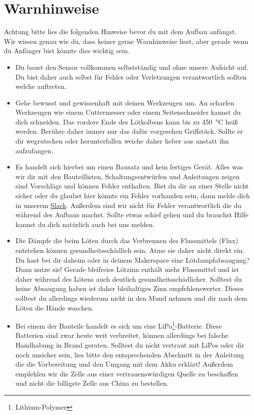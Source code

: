 \documentclass[12pt, a4paper]{article}		%
\begin{document}
\section{Warnhinweise}
Achtung bitte lies die folgenden Hinweise bevor du mit dem Aufbau anfängst. Wir wissen genau wie du, dass keiner gerne Warnhinweise liest, aber gerade wenn du Anfänger bist könnte dies wichtig sein. 

\begin{itemize}
	\item Du baust den Sensor vollkommen selbstständig und ohne unsere Aufsicht auf. Du bist daher auch selbst für Fehler oder Verletzungen verantwortlich sollten welche auftreten.
	\item Gehe bewusst und gewissenhaft mit deinen Werkzeugen um. An scharfen Werkzeugen wie einem Cuttermesser oder einem Seitenschneider kannst du dich schneiden. Das vordere Ende des Lötkolbens kann bis zu \SI{450}{\degreeCelsius} heiß werden. Berühre daher immer nur das dafür vorgesehen Griffstück. Sollte er dir wegrutschen oder herunterfallen weiche daher lieber aus anstatt ihn aufzufangen.
	\item Es handelt sich hierbei um einen Bausatz und kein fertiges Gerät. Alles was wir dir mit den Bauteillisten, Schaltungsentwürfen und Anleitungen zeigen sind Vorschläge und können Fehler enthalten. Bist du dir an einer Stelle nicht sicher oder du glaubst hier könnte ein Fehler vorhanden sein, dann melde dich in unserem \href{openbikesensor.org/slack}{Slack}. Außerdem sind wir nicht für Fehler verantwortlich die du während des Aufbaus machst. Sollte etwas schief gehen und du brauchst Hilfe kannst du dich natürlich auch bei uns melden.
	\item Die Dämpfe die beim Löten durch das Verbrennen des Flussmittels (Flux) entstehen können gesundheitsschädlich sein. Atme sie daher nicht direkt ein. Du hast bei dir daheim oder in deinem Makerspace eine Lötdampfabsaugung? Dann nutze sie! Gerade bleifreies Lötzinn enthält mehr Flussmittel und ist daher während des Lötens auch deutlich gesundheitsschädlicher. Solltest du keine Absaugung haben ist daher bleihaltiges Zinn empfehlenswerter. Dieses solltest du allerdings wiederum nicht in den Mund nehmen und dir nach dem Löten die Hände waschen.
	\item Bei einem der Bauteile handelt es sich um eine LiPo\footnote{Lithium-Polymer}-Batterie. Diese Batterien sind zwar heute weit verbreitet, können allerdings bei falsche Handhabung in Brand geraten. Solltest du nicht vertraut mit LiPos oder dir noch unsicher sein, lies bitte den entsprechenden Abschnitt in der Anleitung die die Vorbereitung und den Umgang mit dem Akku erklärt! Außerdem empfehlen wir die Zelle aus einer vertrauenswürdigen Quelle zu beschaffen und nicht die billigste Zelle aus China zu bestellen.
\end{itemize}
\newpage
\end{document}
